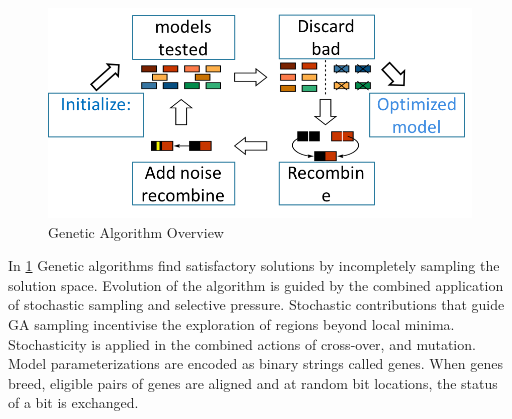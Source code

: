 \begin{center}
\begin{figure}
    \includegraphics[width=0.7\linewidth]{figures/How_Genetic_Alg_Works.png}
  \caption{Genetic Algorithm Overview}
  \label{fig:GeneticAlgOver}
\end{figure}
  
\end{center}

In \ref{fig:GeneticAlgOver}  Genetic algorithms find satisfactory solutions by incompletely sampling the solution space. Evolution of the algorithm is guided by the combined application of stochastic sampling and selective pressure. Stochastic contributions that guide GA sampling incentivise the exploration of regions beyond local minima. Stochasticity is applied in the combined actions of cross-over, and mutation. Model parameterizations are encoded as binary strings called genes. When genes breed, eligible pairs of genes are aligned and at random bit locations, the status of a bit is exchanged.  


